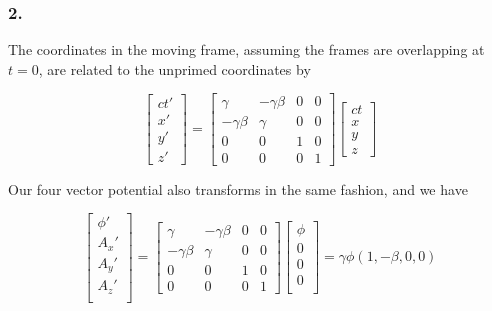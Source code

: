 \subsubsection{2.}

The coordinates in the moving frame, assuming the frames are overlapping at $t=0$, are related to the unprimed coordinates by

\begin{equation}\label{eqn:relElectroDynProblemSet2:930}
\begin{bmatrix}
ct' \\
x' \\
y' \\
z'
\end{bmatrix}
=
\begin{bmatrix}
\gamma & -\gamma \beta & 0 & 0 \\
-\gamma \beta & \gamma & 0 & 0 \\
0 & 0 & 1 & 0 \\
0 & 0 & 0 & 1 
\end{bmatrix}
\begin{bmatrix}
ct \\
x \\
y \\
z
\end{bmatrix}
\end{equation}

Our four vector potential also transforms in the same fashion, and we have

\begin{equation}\label{eqn:relElectroDynProblemSet2:950}
\begin{bmatrix}
\phi' \\
A_x' \\
A_y' \\
A_z' \\
\end{bmatrix}
=
\begin{bmatrix}
\gamma & -\gamma \beta & 0 & 0 \\
-\gamma \beta & \gamma & 0 & 0 \\
0 & 0 & 1 & 0 \\
0 & 0 & 0 & 1 
\end{bmatrix}
\begin{bmatrix}
\phi \\
0 \\
0 \\
0 \\
\end{bmatrix}
= \gamma \phi ( 1, -\beta, 0, 0 )
\end{equation}


